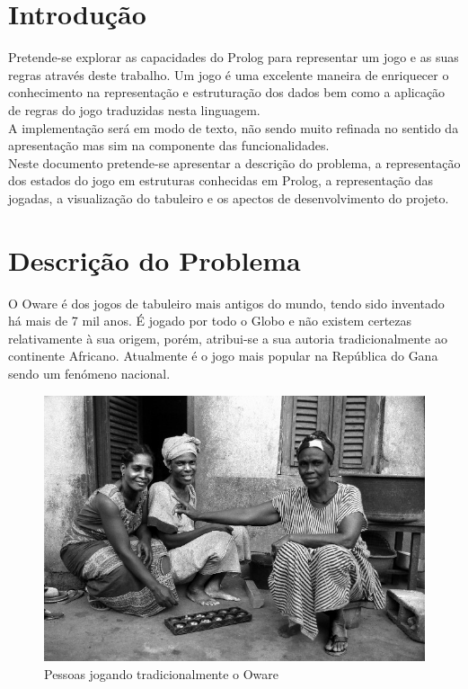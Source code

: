 \documentclass[15pt,a4paper]{article}
\begin{document}


\section{Introdução}
Pretende-se explorar as capacidades do Prolog para representar um jogo e as suas regras através deste trabalho. Um jogo é uma excelente maneira de enriquecer o conhecimento na representação e estruturação dos dados bem como a aplicação de regras do jogo traduzidas nesta linguagem. \\
\indent A implementação será em modo de texto, não sendo muito refinada no sentido da apresentação mas sim na componente das funcionalidades. \\
\indent Neste documento pretende-se apresentar a descrição do problema, a representação dos estados do jogo em estruturas conhecidas em Prolog, a representação das jogadas, a visualização do tabuleiro e os apectos de desenvolvimento do projeto.

\section{Descrição do Problema}
O Oware é dos jogos de tabuleiro mais antigos do mundo, tendo sido inventado há mais de 7 mil anos. É jogado por todo o Globo e não existem certezas relativamente à sua origem, porém, atribui-se a sua autoria tradicionalmente ao continente Africano. Atualmente é o jogo mais popular na República do Gana sendo um fenómeno nacional.

\begin{figure}[h!]
\begin{center}
\includegraphics[scale=20]{awale.jpg}
\caption{Pessoas jogando tradicionalmente o Oware}
\label{fig:traditional}
\end{center}
\end{figure}
\end{document}

